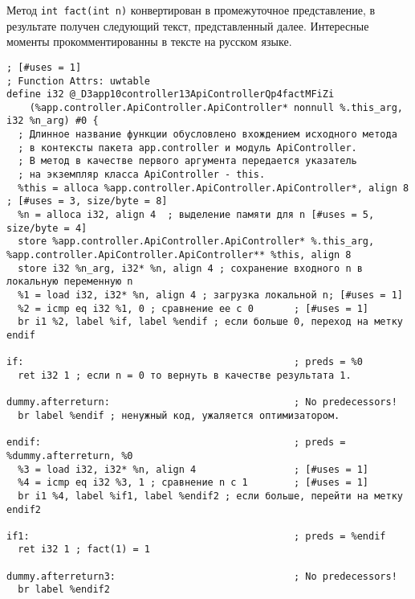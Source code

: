 \documentclass{studrep}
\begin{document}
Метод \verb-int fact(int n)- конвертирован в промежуточное представление, в результате получен следующий текст, представленный далее.  Интересные моменты прокомментированны в тексте на русском языке.

\begin{verbatim}
; [#uses = 1]
; Function Attrs: uwtable
define i32 @_D3app10controller13ApiControllerQp4factMFiZi
    (%app.controller.ApiController.ApiController* nonnull %.this_arg, i32 %n_arg) #0 {
  ; Длинное название функции обусловлено вхождением исходного метода
  ; в контексты пакета app.controller и модуль ApiController.
  ; В метод в качестве первого аргумента передается указатель
  ; на экземпляр класса ApiController - this.
  %this = alloca %app.controller.ApiController.ApiController*, align 8 ; [#uses = 3, size/byte = 8]
  %n = alloca i32, align 4  ; выделение памяти для n [#uses = 5, size/byte = 4]
  store %app.controller.ApiController.ApiController* %.this_arg, %app.controller.ApiController.ApiController** %this, align 8
  store i32 %n_arg, i32* %n, align 4 ; сохранение входного n в локальную переменную n
  %1 = load i32, i32* %n, align 4 ; загрузка локальной n; [#uses = 1]
  %2 = icmp eq i32 %1, 0 ; сравнение ее с 0       ; [#uses = 1]
  br i1 %2, label %if, label %endif ; если больше 0, переход на метку endif

if:                                               ; preds = %0
  ret i32 1 ; если n = 0 то вернуть в качестве результата 1.

dummy.afterreturn:                                ; No predecessors!
  br label %endif ; ненужный код, ужаляется оптимизатором.

endif:                                            ; preds = %dummy.afterreturn, %0
  %3 = load i32, i32* %n, align 4                 ; [#uses = 1]
  %4 = icmp eq i32 %3, 1 ; сравнение n с 1        ; [#uses = 1]
  br i1 %4, label %if1, label %endif2 ; если больше, перейти на метку endif2

if1:                                              ; preds = %endif
  ret i32 1 ; fact(1) = 1

dummy.afterreturn3:                               ; No predecessors!
  br label %endif2


\end{verbatim}
\end{document}
